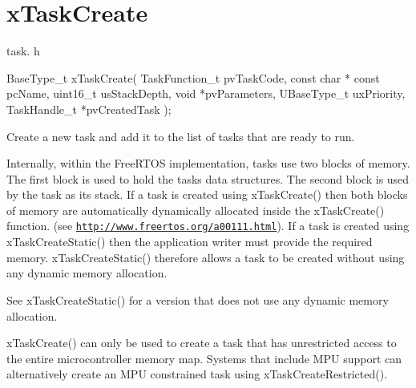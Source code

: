 \hypertarget{group__x_task_create}{}\section{x\+Task\+Create}
\label{group__x_task_create}
task. h 
\begin{DoxyPre}
BaseType\_t xTaskCreate(
                          TaskFunction\_t pvTaskCode,
                          const char * const pcName,
                          uint16\_t usStackDepth,
                          void *pvParameters,
                          UBaseType\_t uxPriority,
                          TaskHandle\_t *pvCreatedTask
                      );\end{DoxyPre}


Create a new task and add it to the list of tasks that are ready to run.

Internally, within the Free\+R\+T\+OS implementation, tasks use two blocks of memory. The first block is used to hold the task\textquotesingle{}s data structures. The second block is used by the task as its stack. If a task is created using x\+Task\+Create() then both blocks of memory are automatically dynamically allocated inside the x\+Task\+Create() function. (see \href{http://www.freertos.org/a00111.html}{\tt http\+://www.\+freertos.\+org/a00111.\+html}). If a task is created using x\+Task\+Create\+Static() then the application writer must provide the required memory. x\+Task\+Create\+Static() therefore allows a task to be created without using any dynamic memory allocation.

See x\+Task\+Create\+Static() for a version that does not use any dynamic memory allocation.

x\+Task\+Create() can only be used to create a task that has unrestricted access to the entire microcontroller memory map. Systems that include M\+PU support can alternatively create an M\+PU constrained task using x\+Task\+Create\+Restricted().


